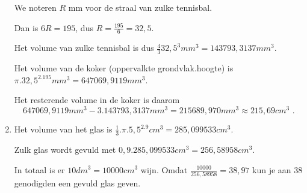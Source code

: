 \documentclass{article}
\begin{document}
\begin{enumerate}
We noteren $R$ mm voor de straal van zulke tennisbal.

Dan is $6R=195$, dus $R=\frac{195}{6}=32,5$.

Het volume van zulke tennisbal is dus $\frac{4}{3} 32,5^3 mm^3=143793,3137 mm^3$.

Het volume van de koker (oppervalkte grondvlak.hoogte) is $\pi .32,5^2.195 mm^3=647069,9119 mm^3$.

Het resterende volume in de koker is daarom
\[
647069,9119 mm^3 - 3.143793,3137 mm^3=215689,970 mm^3 \approx 215,69 cm^3 \text { .}
\]

\item

Het volume van het glas is $\frac{1}{3} . \pi . 5,5^2.9 cm^3=285,099533 cm^3$.

Zulk glas wordt gevuld met $0,9.285,099533 cm^3 = 256,58958 cm^3$.

In totaal is er $10 dm^3=10000 cm^3$ wijn.
Omdat $\frac{10000}{256,58958}=38,97$ kun je aan 38 genodigden een gevuld glas geven.

\end{enumerate}
\end{document}
